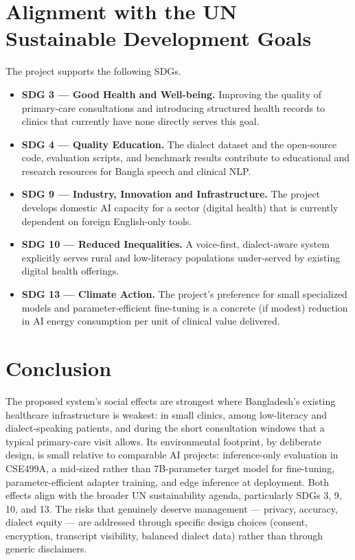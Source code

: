 \documentclass[12pt,a4paper]{article}
\begin{document}
\section{Alignment with the UN Sustainable Development Goals}

The project supports the following SDGs.

\begin{itemize}[leftmargin=*]
\item \textbf{SDG 3 --- Good Health and Well-being.} Improving the
quality of primary-care consultations and introducing structured
health records to clinics that currently have none directly serves
this goal.
\item \textbf{SDG 4 --- Quality Education.} The dialect dataset and
the open-source code, evaluation scripts, and benchmark results
contribute to educational and research resources for Bangla speech
and clinical NLP.
\item \textbf{SDG 9 --- Industry, Innovation and Infrastructure.} The
project develops domestic AI capacity for a sector (digital health)
that is currently dependent on foreign English-only tools.
\item \textbf{SDG 10 --- Reduced Inequalities.} A voice-first,
dialect-aware system explicitly serves rural and low-literacy
populations under-served by existing digital health offerings.
\item \textbf{SDG 13 --- Climate Action.} The project's preference
for small specialized models and parameter-efficient fine-tuning is
a concrete (if modest) reduction in AI energy consumption per unit
of clinical value delivered.
\end{itemize}

\section{Conclusion}

The proposed system's social effects are strongest where Bangladesh's
existing healthcare infrastructure is weakest: in small clinics,
among low-literacy and dialect-speaking patients, and during the
short consultation windows that a typical primary-care visit
allows. Its environmental footprint, by deliberate design, is small
relative to comparable AI projects: inference-only evaluation in
CSE499A, a mid-sized rather than 7B-parameter target model for
fine-tuning, parameter-efficient adapter training, and edge
inference at deployment. Both effects align with the broader UN
sustainability agenda, particularly SDGs 3, 9, 10, and 13. The risks
that genuinely deserve management --- privacy, accuracy, dialect
equity --- are addressed through specific design choices (consent,
encryption, transcript visibility, balanced dialect data) rather
than through generic disclaimers.
\end{document}
